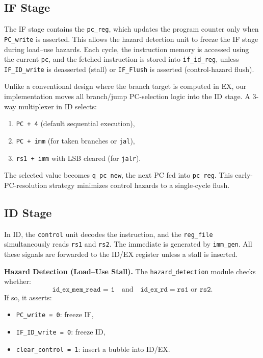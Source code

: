 \documentclass{article}
\begin{document}
\subsection{IF Stage }

The IF stage contains the \texttt{pc\_reg}, which updates the program counter only when \texttt{PC\_write} is asserted. This allows the hazard detection unit to freeze the IF stage during load–use hazards. Each cycle, the instruction memory is accessed using the current \texttt{pc}, and the fetched instruction is stored into \texttt{if\_id\_reg}, unless \texttt{IF\_ID\_write} is deasserted (stall) or \texttt{IF\_Flush} is asserted (control-hazard flush).

Unlike a conventional design where the branch target is computed in EX, our implementation moves all branch/jump PC-selection logic into the ID stage. A 3-way multiplexer in ID selects:
\begin{enumerate}
    \item \texttt{PC + 4} (default sequential execution),
    \item \texttt{PC + imm} (for taken branches or \texttt{jal}),
    \item \texttt{rs1 + imm} with LSB cleared (for \texttt{jalr}).
\end{enumerate}
The selected value becomes \texttt{q\_pc\_new}, the next PC fed into \texttt{pc\_reg}.
This early-PC-resolution strategy minimizes control hazards to a single-cycle flush.


\subsection{ID Stage}

In ID, the \texttt{control} unit decodes the instruction, and the \texttt{reg\_file} simultaneously reads \texttt{rs1} and \texttt{rs2}. The immediate is generated by \texttt{imm\_gen}. All these signals are forwarded to the ID/EX register unless a stall is inserted.

\textbf{Hazard Detection (Load–Use Stall).}
The \texttt{hazard\_detection} module checks whether:
\[
\texttt{id\_ex\_mem\_read = 1} \quad \text{and} \quad \texttt{id\_ex\_rd} = \texttt{rs1} \text{ or } \texttt{rs2}.
\]
If so, it asserts:
\begin{itemize}
    \item \texttt{PC\_write = 0}: freeze IF,
    \item \texttt{IF\_ID\_write = 0}: freeze ID,
    \item \texttt{clear\_control = 1}: insert a bubble into ID/EX.
\end{itemize}
\end{document}
